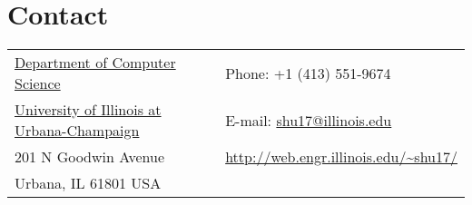 \section{\sc Contact}
\vspace{.05in}
\begin{tabular}{@{}p{3.6in}p{4in}}
{\href{http://www.cs.illinois.edu/}{Department of Computer Science}}           & {Phone:}  +1 (413) 551-9674 \\
{\href{http://www.illinois.edu/}{University of Illinois at Urbana-Champaign}}  & {E-mail:} {\href{mailto:shu17@illinois.edu}{shu17@illinois.edu}}\\
201 N Goodwin Avenue                                                           & {\url{http://web.engr.illinois.edu/~shu17/}}\\
Urbana, IL 61801 USA\\
\end{tabular}



